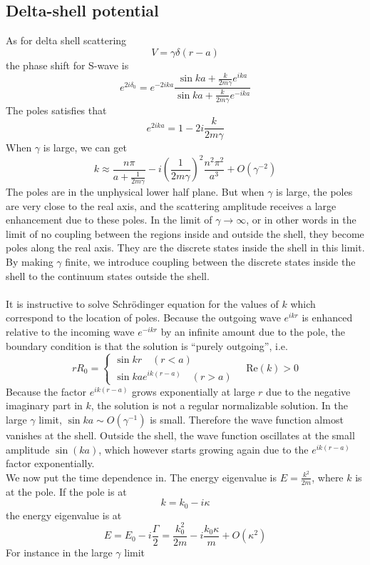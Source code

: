 \subsection{Delta-shell potential}
As for delta shell scattering
\[V = \gamma\delta(r-a)\]
the phase shift for S-wave is
\[e^{2i\delta_0} = e^{-2ika}\frac{\sin ka + \frac{k}{2m\gamma}e^{ika}}{\sin ka + \frac{k}{2m\gamma}e^{-ika}}\]
The poles satisfies that
\[e^{2ika} = 1 - 2i\frac{k}{2m\gamma}\]
When $\gamma$ is large, we can get
\[k \approx \frac{n\pi}{a + \frac{1}{2m\gamma}} -i \left(\frac{1}{2m\gamma} \right)^2 \frac{n^2\pi^2}{a^3} + O(\gamma^{-2})\]
The poles are in the unphysical lower half plane. But when $\gamma$ is large, the poles are very close to the real axis, and the scattering amplitude receives a large enhancement due to these poles. 
In the limit of $\gamma \to \infty$, or in other words in the limit of no coupling between the regions inside and outside the shell, they become poles along the real axis. 
They are the discrete states inside the shell in this limit. 
By making $\gamma$ finite, we introduce coupling between the discrete states inside the shell to the continuum states outside the shell.
\\ \\
It is instructive to solve Schrödinger equation for the values of $k$ which correspond to the location of poles. Because the outgoing wave $e^{ikr}$ is enhanced relative to the incoming wave $e^{-ikr}$ by an infinite amount due to the pole, the boundary condition is that the solution is ``purely outgoing'', i.e.
\[rR_0 = \begin{cases} \sin kr \quad (r<a) \\ \sin ka e^{ik(r-a)} \quad (r>a)  \end{cases} \quad \mathrm{Re}(k) > 0\]
Because the factor $e^{ik(r-a)}$ grows exponentially at large $r$ due to the negative imaginary part in $k$, the solution is not a regular normalizable solution.
In the large $\gamma$ limit, $\sin ka \sim O(\gamma^{-1})$ is small. Therefore the wave function almost vanishes at the shell.
Outside the shell, the wave function oscillates at the small amplitude $\sin(ka)$, which however starts growing again due to the $e^{ik(r-a)}$ factor exponentially.
\\
We now put the time dependence in. The energy eigenvalue
is $E = \frac{k^2}{2m}$, where $k$ is at the pole. If the pole is at
\[k = k_0 - i\kappa\]
the energy eigenvalue is at
\[E = E_0 - i\frac{\Gamma}{2} = \frac{k_0^2}{2m} - i \frac{k_0\kappa}{m} + O(\kappa^2)\]
For instance in the large $\gamma$ limit

